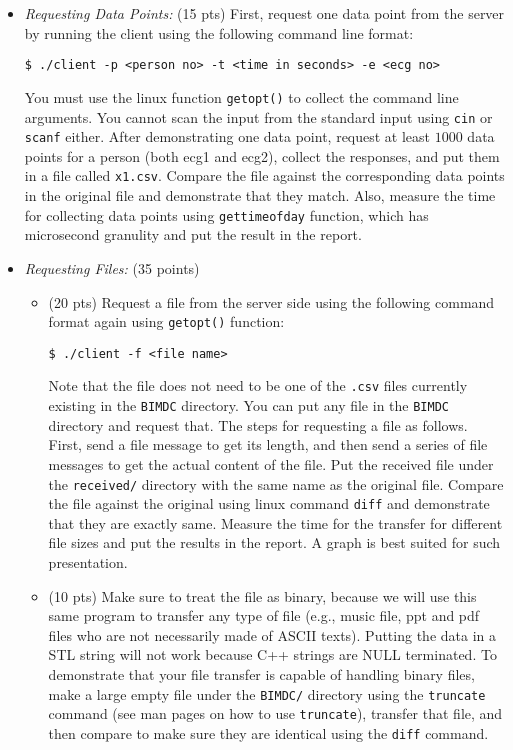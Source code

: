 \documentclass[12pt]{article}
\begin{document}
\begin{itemize}

\item \emph{Requesting Data Points:} (15 pts) 
First, request one data point from the server by running the client using the following command line format:
\begin{lstlisting}[style=bash]
	$ ./client -p <person no> -t <time in seconds> -e <ecg no> 
\end{lstlisting}

You must use the linux function \texttt{getopt()} to collect the command line arguments. You cannot scan the input from the standard input using \texttt{cin} or \texttt{scanf} either. After demonstrating one data point, request at least $1000$ data points for a person (both ecg1 and ecg2), collect the responses, and put them in a file called \texttt{x1.csv}. Compare the file against the corresponding data points in the original file and demonstrate that they match. Also, measure the time for collecting data points using \texttt{gettimeofday} function, which has microsecond granulity and put the result in the report.

\item \emph{Requesting Files:} (35 points)
\begin{itemize}
\item (20 pts) Request a file from the server side using the following command format again using \texttt{getopt()} function:
\begin{lstlisting}[style=bash]
	$ ./client -f <file name>
\end{lstlisting}
Note that the file does not need to be one of the \texttt{.csv} files currently existing in the \texttt{BIMDC} directory. You can put any file in the \texttt{BIMDC} directory and request that. The steps for requesting a file as follows. First, send a file message to get its length, and then send a series of file messages to get the actual content of the file. Put the received file under the \texttt{received/} directory with the same name as the original file. Compare the file against the original using linux command \texttt{diff} and demonstrate that they are exactly same. Measure the time for the transfer for different file sizes and put the results in the report. A graph is best suited for such presentation. 

\item (10 pts) Make sure to treat the file as binary, because we will use this same program to transfer any type of file (e.g., music file, ppt and pdf files who are not necessarily made of ASCII texts). Putting the data in a STL string will not work because C++ strings are NULL terminated. To demonstrate that your file transfer is capable of handling binary files, make a large empty file under the \texttt{BIMDC/} directory using the \texttt{truncate} command (see man pages on how to use \texttt{truncate}), transfer that file, and then compare to make sure they are identical using the \texttt{diff} command.


\end{itemize}
\end{itemize}
\end{document}
